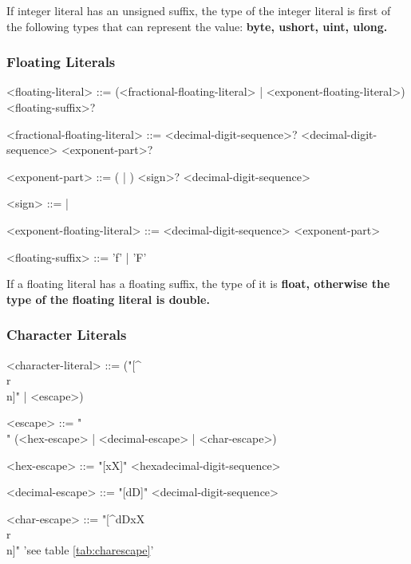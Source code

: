 \documentclass[a4paper,oneside,11pt]{article}
\begin{document}
If integer literal has an unsigned suffix, the type of the integer literal is
first of the following types that can represent the value:
\bf{byte}, \bf{ushort}, \bf{uint}, \bf{ulong}.

\subsubsection{Floating Literals}

\begin{grammar}
\label{floating-literal}<floating-literal> ::= (<fractional-floating-literal> | <exponent-floating-literal>) <floating-suffix>?

<fractional-floating-literal> ::= <decimal-digit-sequence>?  <decimal-digit-sequence> <exponent-part>?
 

<exponent-part> ::= ( | ) <sign>? <decimal-digit-sequence>

<sign> ::= \lit*{+} | \lit*{-}

<exponent-floating-literal> ::= <decimal-digit-sequence> <exponent-part>

<floating-suffix> ::= 'f' | 'F'

\end{grammar}

If a floating literal has a floating suffix, the type of it is \bf{float},
otherwise the type of the floating literal is \bf{double}.

\subsubsection{Character Literals}

\begin{grammar}
\label{character-literal}<character-literal> ::=  ("[^\\r\\n]" | <escape>) 

<escape> ::= "\\" (<hex-escape> | <decimal-escape> | <char-escape>)

<hex-escape> ::= "[xX]" <hexadecimal-digit-sequence>

<decimal-escape> ::= "[dD]" <decimal-digit-sequence>

<char-escape> ::= "[^dDxX\\r\\n]" 'see table \ref{tab:charescape}'

\end{grammar}
\end{document}
